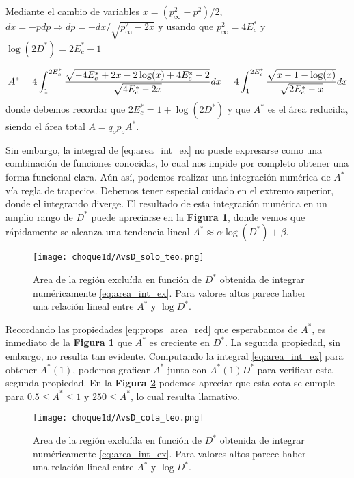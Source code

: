 Mediante el cambio de variables $x = (p_\infty^2-p^2)/2$, $dx = -p dp \Rightarrow dp = -dx/\sqrt{p_\infty^2-2x}$ y usando que $p_\infty^2 = 4E^*_c$ y $\log(2D^*) = 2E_c^* - 1$

\begin{equation}{\label{eq:area_int_ex}}
A^* = 4\int_{1}^{2E_c^*} \frac{\sqrt{-4E_c^* + 2x - 2\log(x) + 4E_c^* - 2}}{\sqrt{4E_c^* - 2x}} dx
= 4\int_{1}^{2E_c^*} \frac{\sqrt{x -1 - \log(x)}}{\sqrt{2E_c^* - x}} dx
\end{equation}
donde debemos recordar que $2E_c^* = 1 + \log(2D^*) $ y que $A^*$ es el área reducida, siendo el área total $A = q_op_oA^*$.

Sin embargo, la integral de \eqref{eq:area_int_ex} no puede expresarse como una combinación de funciones conocidas, lo cual nos impide por completo obtener una forma funcional clara.
Aún así, podemos realizar una integración numérica de $A^*$ vía regla de trapecios.
Debemos tener especial cuidado en el extremo superior, donde el integrando diverge.
El resultado de esta integración numérica en un amplio rango de $D^*$ puede apreciarse en la \textbf{Figura \ref{fig:AvsD_teo}}, donde vemos que rápidamente se alcanza una tendencia lineal $A^* \approx \alpha \log(D^*) + \beta$.

\begin{figure}[h]
	\centering
	\texttt{[image: choque1d/AvsD\_solo\_teo.png]}
	\caption{Area de la región excluída en función de $D^*$ obtenida de integrar numéricamente \eqref{eq:area_int_ex}. Para valores altos parece haber una relación lineal entre $A^*$ y $\log D^*$.}
	\label{fig:AvsD_teo}
\end{figure}

Recordando las propiedades \eqref{eq:props_area_red} que esperabamos de $A^*$, es inmediato de la \textbf{Figura \ref{fig:AvsD_teo}} que $A^*$ es creciente en $D^*$.
La segunda propiedad, sin embargo, no resulta tan evidente. 
Computando la integral \eqref{eq:area_int_ex} para obtener $A^*(1)$, podemos graficar $A^*$ junto con $A^*(1)D^*$ para verificar esta segunda propiedad.
En la \textbf{Figura \ref{fig:AvsD_teo_cota}} podemos apreciar que esta cota se cumple para  $0.5\leq A^*\leq 1$ y $250\leq A^*$, lo cual resulta llamativo.

\begin{figure}[h]
	\centering
	\texttt{[image: choque1d/AvsD\_cota\_teo.png]}
	\caption{Area de la región excluída en función de $D^*$ obtenida de integrar numéricamente \eqref{eq:area_int_ex}. Para valores altos parece haber una relación lineal entre $A^*$ y $\log D^*$.}
	\label{fig:AvsD_teo_cota}
\end{figure}

